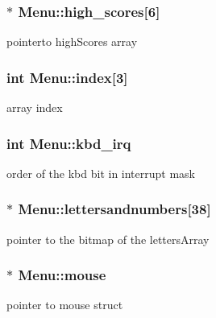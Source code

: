 \subsubsection[{\texorpdfstring{high\+\_\+scores}{high_scores}}]{$\ast$ Menu\+::high\+\_\+scores\mbox{[}6\mbox{]}}\hypertarget{structMenu_a9c1889a4d8a16ecb6c557258cf84897f}{}\label{structMenu_a9c1889a4d8a16ecb6c557258cf84897f}
pointerto high\+Scores array 
\subsubsection[{\texorpdfstring{index}{index}}]{\setlength{\rightskip}{0pt plus 5cm}int Menu\+::index\mbox{[}3\mbox{]}}\hypertarget{structMenu_ac1b1b1910d8a2190336d4e52681d896f}{}\label{structMenu_ac1b1b1910d8a2190336d4e52681d896f}
array index 
\subsubsection[{\texorpdfstring{kbd\+\_\+irq}{kbd_irq}}]{\setlength{\rightskip}{0pt plus 5cm}int Menu\+::kbd\+\_\+irq}\hypertarget{structMenu_a354e72a664d417dd79557bff5beb1c65}{}\label{structMenu_a354e72a664d417dd79557bff5beb1c65}
order of the kbd bit in interrupt mask 
\subsubsection[{\texorpdfstring{lettersandnumbers}{lettersandnumbers}}]{$\ast$ Menu\+::lettersandnumbers\mbox{[}38\mbox{]}}\hypertarget{structMenu_afb3648c7b0f7daca6b145aca4ef5655b}{}\label{structMenu_afb3648c7b0f7daca6b145aca4ef5655b}
pointer to the bitmap of the letters\+Array 
\subsubsection[{\texorpdfstring{mouse}{mouse}}]{$\ast$ Menu\+::mouse}\hypertarget{structMenu_a297aca0913c4ffadaf3848b5914e78ee}{}\label{structMenu_a297aca0913c4ffadaf3848b5914e78ee}
pointer to mouse struct 

